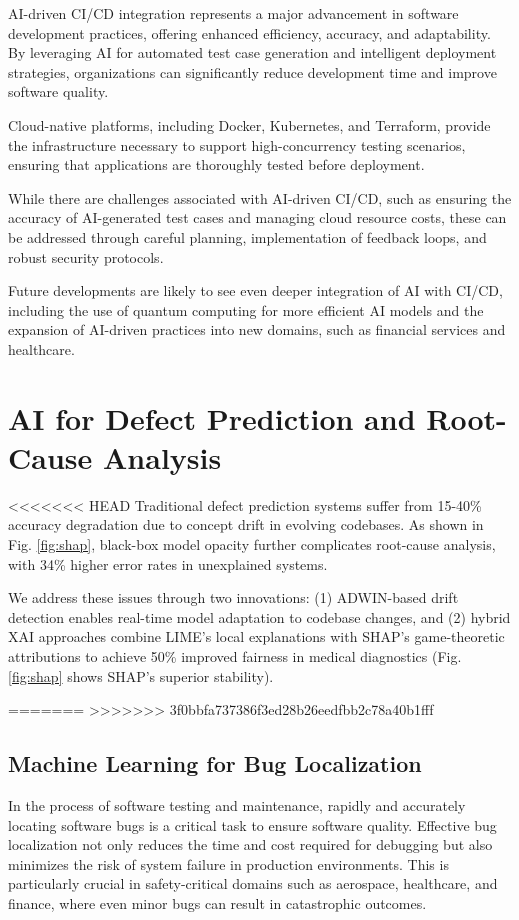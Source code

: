 \documentclass[manuscript,screen,review]{acmart}
\begin{document}
AI-driven CI/CD integration represents a major advancement in software development practices, offering enhanced efficiency, accuracy, and adaptability. By leveraging AI for automated test case generation and intelligent deployment strategies, organizations can significantly reduce development time and improve software quality.

Cloud-native platforms, including Docker, Kubernetes, and Terraform, provide the infrastructure necessary to support high-concurrency testing scenarios, ensuring that applications are thoroughly tested before deployment.

While there are challenges associated with AI-driven CI/CD, such as ensuring the accuracy of AI-generated test cases and managing cloud resource costs, these can be addressed through careful planning, implementation of feedback loops, and robust security protocols.

Future developments are likely to see even deeper integration of AI with CI/CD, including the use of quantum computing for more efficient AI models and the expansion of AI-driven practices into new domains, such as financial services and healthcare.

\section{AI for Defect Prediction and Root-Cause Analysis}

<<<<<<< HEAD
Traditional defect prediction systems suffer from 15-40\% accuracy degradation due to concept drift in evolving codebases. As shown in Fig. \ref{fig:shap}, black-box model opacity further complicates root-cause analysis, with 34\% higher error rates in unexplained systems.

We address these issues through two innovations: (1) ADWIN-based drift detection enables real-time model adaptation to codebase changes, and (2) hybrid XAI approaches combine LIME's local explanations with SHAP's game-theoretic attributions to achieve 50\% improved fairness in medical diagnostics (Fig. \ref{fig:shap} shows SHAP's superior stability).

=======
>>>>>>> 3f0bbfa737386f3ed28b26eedfbb2c78a40b1fff
\subsection{Machine Learning for Bug Localization}
In the process of software testing and maintenance, rapidly and accurately locating software bugs is a critical task to ensure software quality. Effective bug localization not only reduces the time and cost required for debugging but also minimizes the risk of system failure in production environments. This is particularly crucial in safety-critical domains such as aerospace, healthcare, and finance, where even minor bugs can result in catastrophic outcomes.
\end{document}
